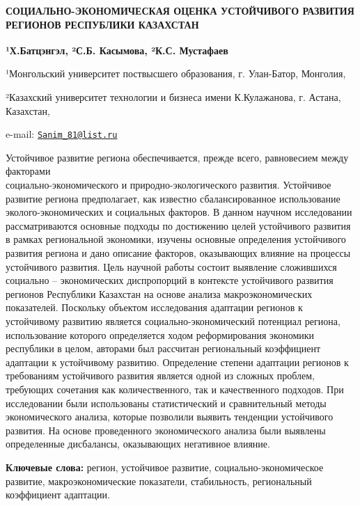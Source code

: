 \begin{articleheader}
{\bfseries СОЦИАЛЬНО-ЭКОНОМИЧЕСКАЯ ОЦЕНКА УСТОЙЧИВОГО РАЗВИТИЯ РЕГИОНОВ
РЕСПУБЛИКИ КАЗАХСТАН}

{\bfseries ¹Х.Батцэнгэл\textsuperscript{\envelope }, ²С.Б. Касымова, ²К.С.
Мустафаев}
\end{articleheader}

\begin{affiliation}
¹Монгольский университет поствысшего образования, г. Улан-Батор,
Монголия,

²Казахский университет технологии и бизнеса имени К.Кулажанова, г.
Астана, Казахстан,

e-mail: \href{mailto:Sanim_81@list.ru}{\nolinkurl{Sanim\_81@list.ru}}
\end{affiliation}

Устойчивое развитие региона обеспечивается, прежде всего, равновесием
между факторами \\социально-экономического и природно-экологического
развития. Устойчивое развитие региона предполагает, как известно
сбалансированное использование эколого-экономических и социальных
факторов. В данном научном исследовании рассматриваются основные подходы
по достижению целей устойчивого развития в рамках региональной
экономики, изучены основные определения устойчивого развития региона и
дано описание факторов, оказывающих влияние на процессы устойчивого
развития. Цель научной работы состоит выявление сложившихся социально --
экономических диспропорций в контексте устойчивого развития регионов
Республики Казахстан на основе анализа макроэкономических показателей.
Поскольку объектом исследования адаптации регионов к устойчивому
развитию является социально-экономический потенциал региона,
использование которого определяется ходом реформирования экономики
республики в целом, авторами был рассчитан региональный коэффициент
адаптации к устойчивому развитию. Определение степени адаптации регионов
к требованиям устойчивого развития является одной из сложных проблем,
требующих сочетания как количественного, так и качественного подходов.
При исследовании были использованы статистический и сравнительный методы
экономического анализа, которые позволили выявить тенденции устойчивого
развития. На основе проведенного экономического анализа были выявлены
определенные дисбалансы, оказывающих негативное влияние.

{\bfseries Ключевые слова:} регион, устойчивое развитие,
социально-экономическое развитие, макроэкономические показатели,
стабильность, региональный коэффициент адаптации.

